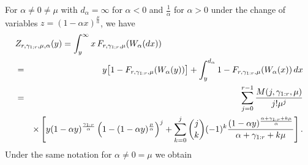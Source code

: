 \documentclass [11pt]{article}
\begin{document}
%
%
For $\alpha \neq 0 \neq \mu$  with $d_\alpha= \infty$ for $\alpha <0$
and $\frac{1}{\alpha}$ for $\alpha >0$ under the change of variables
$z= (1-\alpha x)^{\frac{\mu}{\alpha}}$,
we have
\begin{eqnarray}
\lefteqn{Z_{r,\gamma_{1;r}, \mu,\alpha}(y)=
\int_y^\infty x \,F_{r,\gamma_{1;r}, \mu} (W_\alpha (dx)) }
\nonumber \\ 
& = &
y \bigl[1-F_{r,\gamma_{1:r}, \mu}(W_\alpha(y))\bigr]
+ \int_y^{d_\alpha} 1-F_{r,\gamma_{1:r}, \mu} (W_\alpha(x))\,dx \nonumber \\
& = & \sum_{j=0}^{r-1}
\frac{M(j,\gamma_{1:r},\mu)}{j!\mu^j} \nonumber \\
& & 
\times\left[ y(1-\alpha y)^{\frac{\gamma_{1:r}}{\alpha}}
\left(1-(1-\alpha y)^{\frac{\mu}{\alpha}}\right)^j +
\sum_{k=0}^j {j \choose k} (-1)^k
\frac{(1-\alpha y)^{\frac{\alpha+ \gamma_{1:r} +k\mu}{\alpha}}}{
\alpha+ \gamma_{1:r} +k\mu}
\right]. \nonumber
\label{25d}
\end{eqnarray}
Under the same notation for $\alpha \neq 0 = \mu$ we obtain
\end{document}
